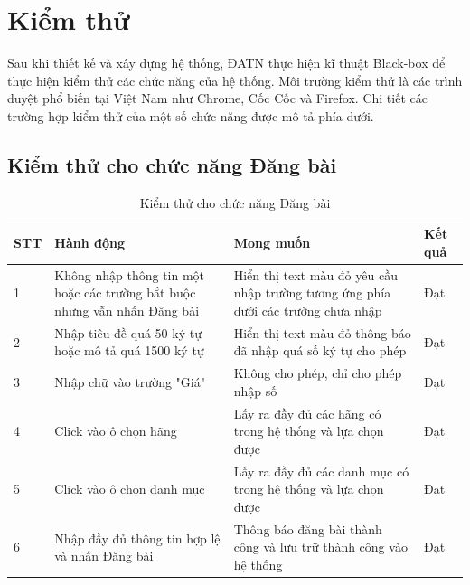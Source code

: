 \documentclass[../DoAn.tex]{subfiles}
\begin{document}
\section{Kiểm thử}
Sau khi thiết kế và xây dựng hệ thống, ĐATN thực hiện kĩ thuật Black-box để thực hiện kiểm thử các chức năng của hệ thống. Môi trường kiểm thử là các trình duyệt phổ biến tại Việt Nam như Chrome, Cốc Cốc và Firefox. Chi tiết các trường hợp kiểm thử của một số chức năng được mô tả phía dưới.
\subsection{Kiểm thử cho chức năng Đăng bài}
\begin{table}[H]
\begin{tabular}{|p{1cm}|p{5cm}|p{6cm}|p{1.5cm}|}
\hline
STT & Hành động                                                                 & Mong muốn                                                                         & Kết quả \\ \hline
1   & Không nhập thông tin một hoặc các trường bắt buộc nhưng vẫn nhấn Đăng bài & Hiển thị text màu đỏ yêu cầu nhập trường tương ứng phía dưới các trường chưa nhập & Đạt     \\ \hline
2   & Nhập tiêu đề quá 50 ký tự hoặc mô tả quá 1500 ký tự                       & Hiển thị text màu đỏ thông báo đã nhập quá số ký tự cho phép                      & Đạt     \\ \hline
3   & Nhập chữ vào trường "Giá"                                                 & Không cho phép, chỉ cho phép nhập số                                              & Đạt     \\ \hline
4   & Click vào ô chọn hãng                                                     & Lấy ra đầy đủ các hãng có trong hệ thống và lựa chọn được                         & Đạt     \\ \hline
5   & Click vào ô chọn danh mục                                                     & Lấy ra đầy đủ các danh mục có trong hệ thống và lựa chọn được                         & Đạt     \\ \hline
6   & Nhập đầy đủ thông tin hợp lệ và nhấn Đăng bài                             & Thông báo đăng bài thành công và lưu trữ thành công vào hệ thống                  & Đạt     \\ \hline
\end{tabular}
\caption{Kiểm thử cho chức năng Đăng bài}

\end{table}
\end{document}

